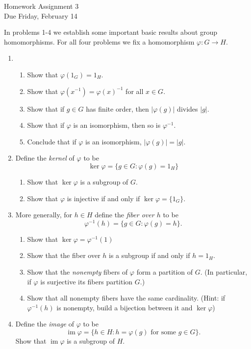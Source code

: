\documentclass[11pt]{article}
\begin{document}
\begin{center}
\Large {Homework Assignment 3}\\
\small {Due Friday, February 14}
\end{center}
In problems 1-4 we establish some important basic results about group homomorphisms.  For all four problems we fix a homomorphism $\varphi:G\to H$.
\begin{enumerate}
\item
\begin{enumerate}
\item Show that $\varphi(1_G) = 1_H$.
\item Show that $\varphi(x^{-1}) = \varphi(x)^{-1}$ for all $x\in G$.
\item Show that if $g\in G$ has finite order, then $|\varphi(g)|$ divides $|g|$.
\item Show that if $\varphi$ is an isomorphism, then so is $\varphi^{-1}$.
\item Conclude that if $\varphi$ is an isomorphism, $|\varphi(g)| = |g|$.
\end{enumerate}
\end{enumerate}
\begin{enumerate}
\setcounter{enumi}{1}
\item Define the \textit{kernel} of $\varphi$ to be
\[\ker\varphi = \{g\in G:\varphi(g) = 1_H\}\]
\begin{enumerate}
\item Show that $\ker\varphi$ is a subgroup of $G$.
\item{Show that $\varphi$ is injective if and only if $\ker\varphi = \{1_G\}$.}
\end{enumerate}
\end{enumerate}
\begin{enumerate}
\setcounter{enumi}{2}
\item More generally, for $h\in H$ define the \textit{fiber over $h$} to be
\[\varphi^{-1}(h) = \{g\in G:\varphi(g) = h\}.\]
\begin{enumerate}
\item{Show that $\ker\varphi = \varphi^{-1}(1)$}
\item{Show that the fiber over $h$ is a subgroup if and only if $h=1_H$.}
\item{Show that the \textit{nonempty} fibers of $\varphi$ form a partition of $G$.  (In particular, if $\varphi$ is surjective its fibers partition $G$.)}
\item{Show that all nonempty fibers have the same cardinality.  (Hint: if $\varphi^{-1}(h)$ is nonempty, build a bijection between it and $\ker\varphi$)}
\end{enumerate}
\item Define the \textit{image} of $\varphi$ to be
\[\operatorname{im}\varphi = \{h\in H:h =\varphi(g)\text{ for some }g\in G\}.\]
Show that $\operatorname{im}\varphi$ is a subgroup of $H$.
\end{enumerate}
\end{document}
